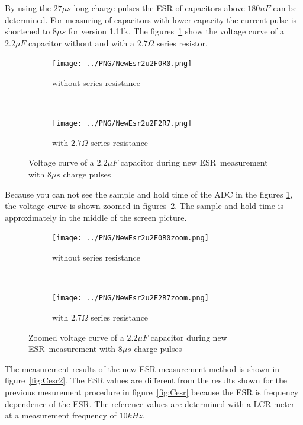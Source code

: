 By using the \(27\mu s\) long charge pulses the ESR of capacitors above \(180nF\) can be determined.
For measuring of capacitors with lower capacity the current pulse is shortened to \(8\mu s\) for version 1.11k.
The figures~\ref{pic:NewEsr2} show the voltage curve of a \(2.2\mu F\) capacitor without and with
a \(2.7\Omega\) series resistor.

\begin{figure}[H]
  \begin{subfigure}[b]{.5\textwidth}
    \centering
    \texttt{[image: ../PNG/NewEsr2u2F0R0.png]}
    \caption{without series resistance}
  \end{subfigure}
  ~
  \begin{subfigure}[b]{.5\textwidth}
    \centering
    \texttt{[image: ../PNG/NewEsr2u2F2R7.png]}
    \caption{with \(2.7\Omega\) series resistance}
  \end{subfigure}
  \caption{Voltage curve of a \(2.2\mu F\) capacitor during new ESR~measurement with \(8\mu s\) charge pulses}
  \label{pic:NewEsr2}
\end{figure}

Because you can not see the sample and hold time of the ADC in the figures \ref{pic:NewEsr2},  the voltage curve is shown zoomed
in figures~\ref{pic:NewEsr2zoom}. The sample and hold time is approximately in the middle of the screen picture.

\begin{figure}[H]
  \begin{subfigure}[b]{.5\textwidth}
    \centering
    \texttt{[image: ../PNG/NewEsr2u2F0R0zoom.png]}
    \caption{without series resistance}
  \end{subfigure}
  ~
  \begin{subfigure}[b]{.5\textwidth}
    \centering
    \texttt{[image: ../PNG/NewEsr2u2F2R7zoom.png]}
    \caption{with \(2.7\Omega\) series resistance}
  \end{subfigure}
  \caption{Zoomed voltage curve of a \(2.2\mu F\) capacitor during new ESR~measurement with \(8\mu s\) charge pulses}
  \label{pic:NewEsr2zoom}
\end{figure}
 

The measurement results of the new ESR measurement method is shown in figure~\ref{fig:Cesr2}.
The ESR values are different from the results shown for the previous mesurement procedure in figure~\ref{fig:Cesr} because 
the ESR is frequency dependence of the ESR.
The reference values are determined with a LCR meter at a measurement frequency of \(10kHz \).

